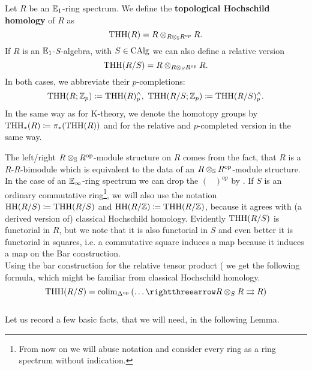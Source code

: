 \begin{defn}
    Let $R$ be an $\mathbb{E}_1$-ring spectrum.
    We define the \textbf{topological Hochschild homology} of $R$ as 
    \begin{equation*}
        \operatorname{THH}(R)=R\otimes_{R\otimes_{\mathbb{S}} R^{op}}R.
    \end{equation*}
    If $R$ is an $\mathbb{E}_1$-$S$-algebra, with $S\in\operatorname{CAlg}$ we can also define a relative version
    \begin{equation*}
        \operatorname{THH}(R/S)=R\otimes_{R\otimes_S R^{op}}R.
    \end{equation*}
    In both cases, we abbreviate their $p$-completions:
    \begin{equation*}
        \THH(R;\Z_p)\coloneqq\THH(R)^{\wedge}_p,\ \THH(R/S;\Z_p)\coloneqq\THH(R/S)^{\wedge}_p.
    \end{equation*}
    In the same way as for K-theory, we denote the homotopy groups by $\operatorname{THH}_*(R)\coloneqq \pi_*(\operatorname{THH}(R))$ and for the relative and $p$-completed version in the same way.
\end{defn}
The left/right $R\otimes_{\mathbb{S}} R^{\operatorname{op}}$-module structure on $R$ comes from the fact, that $R$ is a $R$-$R$-bimodule which is equivalent to the data of an $R\otimes_{\mathbb{S}} R^{\operatorname{op}}$-module structure. 
In the case of an $\mathbb{E}_\infty$-ring spectrum we can drop the $(\phantom{R})^{op}$ by \cite[Section~4.6.3]{lurie2017higher}. 
If $S$ is an ordinary commutative ring\footnote{From now on we will abuse notation and consider every ring as a ring spectrum without indication.}, we will also use the notation $\operatorname{HH}(R/S)\coloneqq \operatorname{THH}(R/S)$ and $\operatorname{HH}(R/\mathbb{Z})\coloneqq \operatorname{THH}(R/\mathbb{Z})$, because it agrees with (a derived version of) classical Hochschild homology.
Evidently $\operatorname{THH}(R/S)$ is functorial in $R$, but we note that it is also functorial in $S$ and even better it is functorial in squares, i.e. a commutative square induces a map because it induces a map on the Bar construction.\\ 
Using the bar construction for the relative tensor product (\cite[Section~4.4.2]{lurie2017higher} we get the following formula, which might be familiar from classical Hochschild homology.
\begin{equation*}
    \THH(R/S)=\colim_{\Delta^{\op}}\left(\dots \rightthreearrow R\otimes_S R\rightrightarrows R\right)
\end{equation*}
\\
Let us record a few basic facts, that we will need, in the following Lemma.

